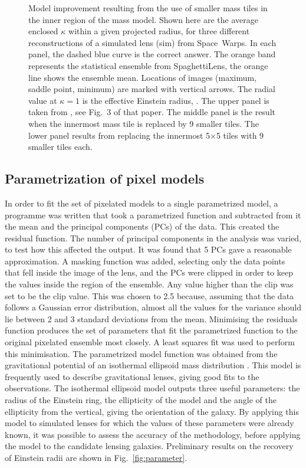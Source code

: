 \begin{figure}
  \caption{Model improvement resulting from the use of smaller mass tiles
    in the inner region of the mass model.  Shown here are the average
    enclosed $\kappa$ within a given projected radius, for three
    different reconstructions of a simulated lens (sim) from
    Space~Warps.  In each panel, the dashed blue curve is the correct
    answer.  The orange band represents the statistical ensemble from
    SpaghettiLens, the orange line shows the ensemble mean.  Locations of
    images (maximum, saddle point, minimum) are marked with vertical
    arrows.  The radial value at $\kappa=1$ is the effective
    Einstein radius, \ER. The upper panel is taken from
    \citet{2015MNRAS.447.2170K}, see Fig.~3 of that paper.  The middle
    panel is the result when the innermost mass tile is replaced by 9
    smaller tiles.  The lower panel results from replacing the
    innermost 5$\times$5 tiles with 9 smaller tiles each.}
  \label{fig:subsampling}
\end{figure}

\subsection{Parametrization of pixel models} \label{subsec:parameter}

In order to fit the set of pixelated models to a single parametrized
model, a programme was written that took a parametrized function and
subtracted from it the mean and the principal components (PCs) of the
data. This created the residual function.  The number of principal
components in the analysis was varied, to test how this affected the
output. It was found that 5 PCs gave a reasonable approximation. A
masking function was added, selecting only the data points that fell
inside the image of the lens, and the PCs were clipped in order to
keep the values inside the region of the ensemble. Any value higher
than the clip was set to be the clip value. This was chosen to 2.5
because, assuming that the data follows a Gaussian error distribution,
almost all the values for the variance should lie between 2 and 3
standard deviations from the mean. Minimising the residuals function
produces the set of parameters that fit the parametrized function to
the original pixelated ensemble most closely.  A least squares fit was
used to perform this minimisation.  The parametrized model function
was obtained from the gravitational potential of an isothermal
ellipsoid mass distribution \citep{2001astro.ph..2341K}.  This model
is frequently used to describe gravitational lenses, giving good fits
to the observations.  The isothermal ellipsoid model outputs three
useful parameters: the radius of the Einstein ring, the ellipticity of
the model and the angle of the ellipticity from the vertical, giving
the orientation of the galaxy.  By applying this model to simulated
lenses for which the values of these parameters were already known, it
was possible to assess the accuracy of the methodology, before
applying the model to the candidate lensing galaxies.  Preliminary
results on the recovery of Einstein radii are shown in
Fig.~\ref{fig:parameter}.

